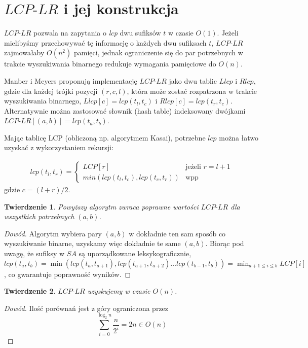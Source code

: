 \documentclass[12pt]{article}
\newtheorem*{theorem}{Twierdzenie}
\begin{document}
\section*{$LCP\textrm{-}LR$ i jej konstrukcja}

$LCP\textrm{-}LR$ pozwala na zapytania o \textit{lcp} dwu sufiksów $t$ w czasie $O(1)$. Jeżeli mielibyśmy przechowywać tę informację o każdych dwu sufiksach $t$, $LCP\textrm{-}LR$ zajmowałaby $O(n^2)$ pamięci, jednak ograniczenie się do par potrzebnych w trakcie wyszukiwania binarnego redukuje wymagania pamięciowe do $O(n)$.

Manber i Meyers proponują implementację $LCP\textrm{-}LR$ jako dwu tablic $Llcp$ i $Rlcp$, gdzie dla każdej trójki pozycji $(r, c, l)$, która może zostać rozpatrzona w trakcie wyszukiwania binarnego, $Llcp[c] = lcp(t_l, t_c)$ i $Rlcp[c] = lcp(t_r, t_c)$. Alternatywnie można zastosować słownik (hash table) indeksowany dwójkami $LCP\textrm{-}LR[(a, b)] = lcp(t_a, t_b)$.

Mając tablicę LCP (obliczoną np. algorytmem Kasai), potrzebne $lcp$ można łatwo uzyskać z wykorzystaniem rekursji:

\begin{align*}
   lcp(t_l, t_r) = 
   \begin{cases}
        LCP[r] & \text{jeżeli } r = l + 1 \\
        min(lcp(t_l, t_c), lcp(t_c, t_r)) & \text{wpp}
   \end{cases}
\end{align*} 
gdzie $c = (l + r) / 2$.

\begin{theorem}
Powyższy algorytm zwraca poprawne wartości $LCP\textrm{-}LR$ dla wszystkich potrzebnych $(a, b)$.
\end{theorem}

\begin{proof}[Dowód]
Algorytm wybiera pary $(a, b)$ w dokładnie ten sam sposób co wyszukiwanie binarne, uzyskamy więc dokładnie te same $(a, b)$. Biorąc pod uwagę, że sufiksy w $SA$ są uporządkowane leksykograficznie, $lcp(t_a, t_b) = \min(lcp(t_a, t_{a + 1}), \allowbreak lcp(t_{a + 1}, t_{a + 2}) \ldots \allowbreak lcp(t_{b-1}, t_{b}))= \min_{a + 1 \leq i \leq b} LCP[i] $, co gwarantuje poprawność wyników.
\end{proof}

\begin{theorem}
$LCP\textrm{-}LR$ uzyskujemy w czasie $O(n)$.
\end{theorem}

\begin{proof}[Dowód]
Ilość porównań jest z góry ograniczona przez $$\sum_{i=0}^{\log_2{n}} \frac{n}{2^i} = 2n \in O(n)$$
\end{proof}
\end{document}
